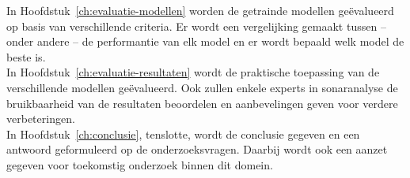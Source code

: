In Hoofdstuk~\ref{ch:evaluatie-modellen} worden de getrainde modellen geëvalueerd op basis van verschillende criteria. Er wordt een vergelijking gemaakt tussen -- onder andere -- de performantie van elk model en er wordt bepaald welk model de beste is. \\

In Hoofdstuk~\ref{ch:evaluatie-resultaten} wordt de praktische toepassing van de verschillende modellen geëvalueerd. Ook zullen enkele experts in sonaranalyse de bruikbaarheid van de resultaten beoordelen en aanbevelingen geven voor verdere verbeteringen. \\

In Hoofdstuk~\ref{ch:conclusie}, tenslotte, wordt de conclusie gegeven en een antwoord geformuleerd op de onderzoeksvragen. Daarbij wordt ook een aanzet gegeven voor toekomstig onderzoek binnen dit domein.